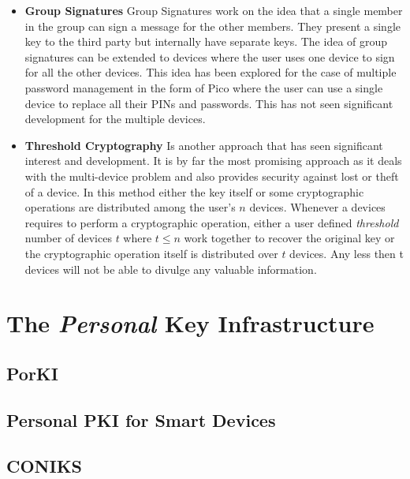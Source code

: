 \begin{itemize}
\item \textbf{Group Signatures} Group Signatures work on the idea that a single member in the group can sign a message for the other members. They present a single key to the third party but internally have separate keys\cite{Bellare2003}. The idea of group signatures can be extended to devices where the user uses one device to sign for all the other devices. This idea has been explored for the case of multiple password management in the form of Pico\cite{Stajano2011} where the user can use a single device to replace all their PINs and passwords. This has not seen significant development for the multiple devices. \\

\item \textbf{Threshold Cryptography} Is another approach that has seen significant interest and development. It is by far the most promising approach as it deals with the multi-device problem and also provides security against lost or theft of a device\cite{Desmedt2001}. In this method either the key itself or some cryptographic operations are distributed among the user's $n$ devices\citep{Desmedt1994}. Whenever a devices requires to perform a cryptographic operation, either a user defined \emph{threshold} number of devices $t$ where $t \leqslant n$ work together to recover the original key or the cryptographic operation itself is distributed over $t$ devices. Any less then t devices will not be able to divulge any valuable information.

\end{itemize}



\section{The \emph{Personal} Key Infrastructure}

\subsection{PorKI}

\subsection{Personal PKI for Smart Devices}

\subsection{CONIKS}

